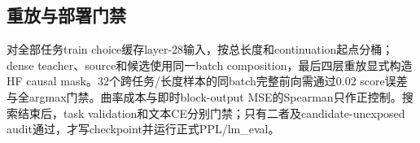 \subsection{重放与部署门禁}

对全部任务train choice缓存layer-28输入，按总长度和continuation起点分桶；dense teacher、source和候选使用同一batch composition，最后四层重放显式构造HF causal mask。32个跨任务/长度样本的同batch完整前向需通过0.02 score误差与全argmax门禁。曲率成本与即时block-output MSE的Spearman只作正控制。搜索结束后，task validation和文本CE分别门禁；只有二者及candidate-unexposed audit通过，才写checkpoint并运行正式PPL/lm\_eval。

